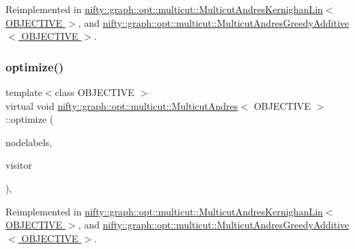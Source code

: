 Reimplemented in \hyperlink{classnifty_1_1graph_1_1opt_1_1multicut_1_1MulticutAndresKernighanLin_aaf7fb543729a5be9211a8dd5400b404a}{nifty\+::graph\+::opt\+::multicut\+::\+Multicut\+Andres\+Kernighan\+Lin$<$ O\+B\+J\+E\+C\+T\+I\+V\+E $>$}, and \hyperlink{classnifty_1_1graph_1_1opt_1_1multicut_1_1MulticutAndresGreedyAdditive_a75661ba64e38f54afa83f9006f6d4586}{nifty\+::graph\+::opt\+::multicut\+::\+Multicut\+Andres\+Greedy\+Additive$<$ O\+B\+J\+E\+C\+T\+I\+V\+E $>$}.

\mbox{\label{classnifty_1_1graph_1_1opt_1_1multicut_1_1MulticutAndres_aa938eb1da7b3af5e0e5935e7bd818c61}} 
\subsubsection{\texorpdfstring{optimize()}{optimize()}}
{\footnotesize\ttfamily template$<$class O\+B\+J\+E\+C\+T\+I\+VE $>$ \\
virtual void \hyperlink{classnifty_1_1graph_1_1opt_1_1multicut_1_1MulticutAndres}{nifty\+::graph\+::opt\+::multicut\+::\+Multicut\+Andres}$<$ O\+B\+J\+E\+C\+T\+I\+VE $>$\+::optimize (\begin{DoxyParamCaption}\item[{\hyperlink{classnifty_1_1graph_1_1opt_1_1multicut_1_1MulticutAndres_a6cd9d64abc4a98aa9745ce1ef0d4ecfe}{Node\+Labels\+Type} \&}]{nodelabels,  }\item[{\hyperlink{classnifty_1_1graph_1_1opt_1_1multicut_1_1MulticutAndres_a295da342b6ebe8a8720cadd1dcce2e57}{Visitor\+Base\+Type} $\ast$}]{visitor }\end{DoxyParamCaption})\hspace{0.3cm}{\ttfamily [inline]}, {\ttfamily [virtual]}}



Reimplemented in \hyperlink{classnifty_1_1graph_1_1opt_1_1multicut_1_1MulticutAndresKernighanLin_af4f27f04beb50edb810b4e750bbc8b46}{nifty\+::graph\+::opt\+::multicut\+::\+Multicut\+Andres\+Kernighan\+Lin$<$ O\+B\+J\+E\+C\+T\+I\+V\+E $>$}, and \hyperlink{classnifty_1_1graph_1_1opt_1_1multicut_1_1MulticutAndresGreedyAdditive_a174b41a0f08004dbfe35be189f287446}{nifty\+::graph\+::opt\+::multicut\+::\+Multicut\+Andres\+Greedy\+Additive$<$ O\+B\+J\+E\+C\+T\+I\+V\+E $>$}.



